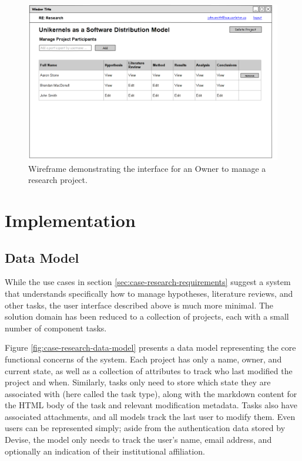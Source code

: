 \documentclass[document.tex]{subfiles}
\begin{document}
\begin{figure}[!ht]
\centering \includegraphics[width=5.5in]{./img/case-study-research-railgun/mockup-manage-project}
\caption{Wireframe demonstrating the interface for an Owner to manage a research project.}
\label{fig:case-research-design-manage-project}
\end{figure}


\FloatBarrier

\section {Implementation}



\subsection {Data Model}

While the use cases in section \ref{sec:case-research-requirements} suggest a system that understands specifically how to manage hypotheses, literature reviews, and other tasks, the user interface described above is much more minimal. The solution domain has been reduced to a collection of projects, each with a small number of component tasks.

Figure \ref{fig:case-research-data-model} presents a data model representing the core functional concerns of the system. Each project has only a name, owner, and current state, as well as a collection of attributes to track who last modified the project and when. Similarly, tasks only need to store which state they are associated with (here called the task type), along with the markdown content for the HTML body of the task and relevant modification metadata. Tasks also have associated attachments, and all models track the last user to modify them. Even users can be represented simply; aside from the authentication data stored by Devise, the model only needs to track the user's name, email address, and optionally an indication of their institutional affiliation.
\end{document}

